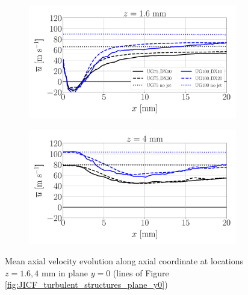 \begin{figure}[ht]
\flushleft
\begin{subfigure}[b]{0.45\textwidth}
	\centering
   \includegraphics[scale=0.22]{./part2_developments/figures_ch5_resolved_JICF/turbulent_structures/line_y0_along_x_z01p6}
\end{subfigure}
\hspace{0.4in}
\begin{subfigure}[b]{0.45\textwidth}
	\centering
   \includegraphics[scale=0.22]{./part2_developments/figures_ch5_resolved_JICF/turbulent_structures/line_y0_along_x_z04}
\end{subfigure}
\caption{Mean axial velocity evolution along axial coordinate at locations $z = 1.6, 4$ mm in plane $y = 0$ (lines of Figure \ref{fig:JICF_turbulent_structures_plane_y0})}
\label{fig:JICF_sps_lines_y0_along_x_ux_mean}
\end{figure}

